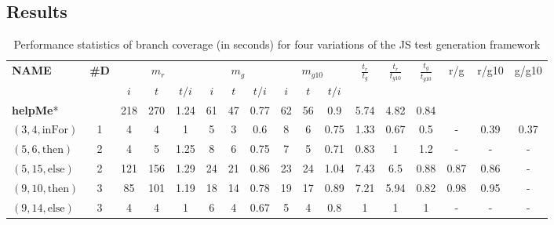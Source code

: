 \documentclass[sigconf]{acmart}
\newcommand{\thenBr}{\text{then}}
\newcommand{\elseBr}{\text{else}}
\newcommand{\inFor}{\text{inFor}}
\begin{document}
\subsection{Results}
\label{sub.sec.eval.results}

\setlength\tabcolsep{0.8pt}
\begin{table}[!t]
  \caption{Performance statistics of branch coverage (in seconds) for four variations of the JS test generation framework}
  \label{tbl.stats}
    \scriptsize
    \begin{tabular}{lc|ccc|ccc|ccc|ccc|ccc}
      \toprule
      \multirow{2}{*}{\textbf{NAME}} & \multirow{2}{*}{\textbf{\#D}}         &  \multicolumn{3}{c|}{$m_r$} & \multicolumn{3}{c|}{$m_g$} & \multicolumn{3}{c|}{$m_{g10}$} & \multirow{2}{*}{$\frac{t_r}{t_g}$} &  \multirow{2}{*}{$\frac{t_r}{t_{g10}}$} & \multirow{2}{*}{$\frac{t_g}{t_{g10}}$}   & \multirow{2}{*}{r/g} &  \multirow{2}{*}{r/g10} & \multirow{2}{*}{g/g10} \\
      \cline{3-11}
            &                & $i$      & $t$  & $t/i$     & $i$& $t$&$t/i$             &$i$ &$t$ &$t/i$               &      &       &        &      &       &      \\
      \toprule
    \multicolumn{2}{l|}{\textbf{helpMe}*}     
                                 & 218      & 270  & 1.24      & 61 & 47 & 0.77             & 62 & 56 & 0.9                & 5.74 & 4.82  & 0.84   &      &      &       \\
    $(3,4,\inFor)$    & 1        & 4        & 4    & 1         & 5  & 3  & 0.6              & 8  & 6  & 0.75               & 1.33 & 0.67  & 0.5    & - & 0.39 & 0.37  \\
    $(5,6,\thenBr)$   & 2        & 4        & 5    & 1.25      & 8  & 6  & 0.75             & 7  & 5  & 0.71               & 0.83 & 1     & 1.2    & - & -  & -  \\
    $(5,15,\elseBr)$  & 2        & 121      & 156  & 1.29      & 24 & 21 & 0.86             & 23 & 24 & 1.04               & 7.43 & 6.5   & 0.88   & 0.87 & 0.86 & -  \\
    $(9,10,\thenBr)$  & 3        & 85       & 101  & 1.19      & 18 & 14 & 0.78             & 19 & 17 & 0.89               & 7.21 & 5.94  & 0.82   & 0.98 & 0.95 & -  \\
    $(9,14,\elseBr)$  & 3        & 4        & 4    & 1         & 6  & 4  & 0.67             & 5  & 4  & 0.8                & 1    & 1     & 1      & - & - & -  \\
    \hline                                                                                                          

\end{tabular}
\end{table}
\end{document}
